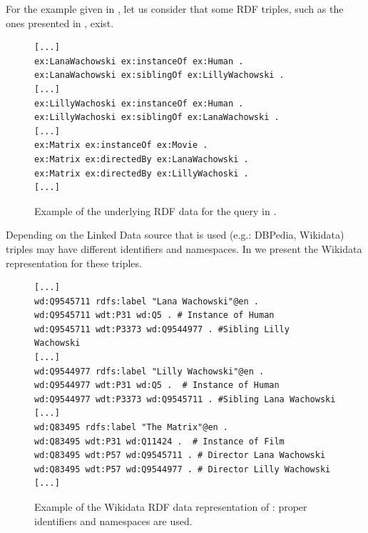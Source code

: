For the example given in , let us consider that some RDF triples, such as the ones presented in , exist. 

\begin{figure}[H]
\begin{verbatim}
[...]
ex:LanaWachowski ex:instanceOf ex:Human . 
ex:LanaWachowski ex:siblingOf ex:LillyWachowski . 
[...]
ex:LillyWachoski ex:instanceOf ex:Human . 
ex:LillyWachoski ex:siblingOf ex:LanaWachowski . 
[...]
ex:Matrix ex:instanceOf ex:Movie .
ex:Matrix ex:directedBy ex:LanaWachowski . 
ex:Matrix ex:directedBy ex:LillyWachoski . 
[...]
\end{verbatim}
\caption{Example of the underlying RDF data for the query in .}
\label{fig:siblingsRDFdata}
\end{figure}

Depending on the Linked Data source that is used (e.g.: DBPedia, Wikidata) triples may have different identifiers and namespaces. In  we present the Wikidata representation for these triples.

\begin{figure}[H]
\begin{verbatim}
[...]
wd:Q9545711 rdfs:label "Lana Wachowski"@en .
wd:Q9545711 wdt:P31 wd:Q5 . # Instance of Human
wd:Q9545711 wdt:P3373 wd:Q9544977 . #Sibling Lilly Wachowski
[...]
wd:Q9544977 rdfs:label "Lilly Wachowski"@en .
wd:Q9544977 wdt:P31 wd:Q5 .  # Instance of Human
wd:Q9544977 wdt:P3373 wd:Q9545711 . #Sibling Lana Wachowski
[...]
wd:Q83495 rdfs:label "The Matrix"@en .
wd:Q83495 wdt:P31 wd:Q11424 .  # Instance of Film
wd:Q83495 wdt:P57 wd:Q9545711 . # Director Lana Wachowski
wd:Q83495 wdt:P57 wd:Q9544977 . # Director Lilly Wachowski
[...]
\end{verbatim}
\caption{Example of the Wikidata RDF data representation of : proper identifiers and namespaces are used.}
\label{fig:siblingsWikidataRDF}
\end{figure}

